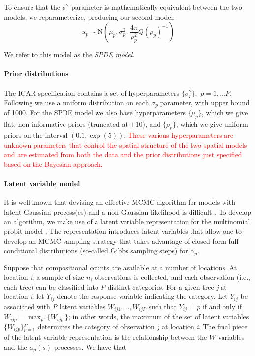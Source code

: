\documentclass[10pt,letterpaper]{article}
\begin{document}
To ensure that the $\sigma^{2}$ parameter is mathematically equivalent
between the two models, we reparameterize, producing our second model:
\[
\alpha_{p}\sim\mbox{N}\left(\mu_{p},\sigma_{p}^{2}\cdot\frac{4\pi}{\rho_{p}^{2}}Q(\rho_{p})^{-1}\right)
\]


We refer to this model as the \emph{SPDE model}.



\paragraph*{Prior distributions}

\noindent The ICAR specification contains a set of hyperparameters
$\{\sigma_{p}^{2}\},$ $p=1,\ldots P$. Following \cite{Gelm:2006}
we use a uniform distribution on each $\sigma_{p}$ parameter, with
upper bound of 1000. For the SPDE model we also have hyperparameters
$\{\mu_{p}\}$, which we give flat, non-informative priors (truncated
at $\pm10$), and $\{\rho_{p}\}$, which we give uniform priors on
the interval $(0.1,\exp(5))$. \textcolor{red}{These various hyperparameters
are unknown parameters that control the spatial structure of the two
spatial models and are estimated from both the data and the prior
distributions just specified based on the Bayesian approach.}


\paragraph*{Latent variable model\label{sub:Latent-Variable-Model}}

It is well-known that devising an effective MCMC algorithm for models
with latent Gaussian process(es) and a non-Gaussian likelihood is
difficult \cite{Rue:Held:2005,Chri:etal:2006,Tan:Nott:2013}. To
develop an algorithm, we make use of a latent variable representation
for the multinomial probit model \cite{McCu:Ross:1994}. The representation
introduces latent variables that allow one to develop an MCMC sampling
strategy that takes advantage of closed-form full conditional distributions
(so-called Gibbs sampling steps) for $\alpha_{p}$.

Suppose that compositional counts are available at a number of locations.
At location \emph{i}, a sample of size $n_{i}$ observations is collected,
and each observation (i.e., each tree) can be classified into \emph{P}
distinct categories. For a given tree \emph{j} at location \emph{i}, let $Y_{ij}$
denote the response variable indicating the category. Let $Y_{ij}$
be associated with \emph{P} latent variables $W_{ij1},...,W_{ijP}$ such
that $Y_{ij}$ = $p$ if and only if $W_{ijp}={\displaystyle \max_{p'}\big\{ W_{ijp'}\big\}}$;
in other words, the maximum of the set of latent variables $\{W_{ijp}\}{\displaystyle _{p=1}^{P}}$
determines the category of observation $j$ at location \emph{i}. The
final piece of the latent variable representation is the relationship
between the $W$ variables and the $\alpha_{p}(s)$ processes. We
have that
\end{document}
